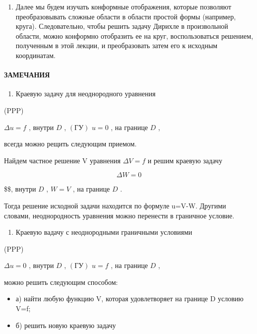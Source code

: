 \documentclass[
  ukrainian,
]{article}
\providecommand{\tightlist}{%
  \setlength{\itemsep}{0pt}\setlength{\parskip}{0pt}}
\begin{document}
\begin{enumerate}
\def\labelenumi{\arabic{enumi}.}
\setcounter{enumi}{1}
\tightlist
\item
  Далее мы будем изучать конформные отображения, которые позволяют
  преобразовывать сложные области в области простой формы (например,
  круга). Следовательно, чтобы решить задачу Дирихле в произвольной
  области, можно конформно отобразить ее на круг, воспользоваться
  решением, полученным в этой лекции, и преобразовать затем его к
  исходным координатам.
\end{enumerate}

\paragraph{ЗАМЕЧАНИЯ}\label{ux437ux430ux43cux435ux447ux430ux43dux438ux44f-8}

\begin{enumerate}
\def\labelenumi{\arabic{enumi}.}
\tightlist
\item
  Краевую задачу для неоднородного уравнения
\end{enumerate}

(PPP)

\(\Delta u = f\) , внутри \(D\) , \((ГУ)\) \(u = 0\) , на границе \(D\)
,

всегда можно рещить следующим приемом.

Найдем частное решение V уравнения \(\Delta V = f\) и решим краевую
задачу

\[
\Delta W = 0
\]

\$\$, внутри \(D\) , \(W = V\) , на границе \(D\) .

Тогда решение исходной задачи находится по формуле u=V-W. Другими
словами, неоднородность уравнения можно перенести в граничное условие.

\begin{enumerate}
\def\labelenumi{\arabic{enumi}.}
\setcounter{enumi}{1}
\tightlist
\item
  Краевую вадачу с неоднородными граничными условиями
\end{enumerate}

(PPP)

\(\Delta u = 0\) , внутри \(D\) , \((ГУ)\) \(u = f\) , на границе \(D\)
,

можно решить следующим способом:

\begin{itemize}
\tightlist
\item
  а) найти любую функцию V, которая удовлетворяет на границе D условию
  V=f;
\item
  б) решить новую краевую задачу
\end{itemize}
\end{document}
